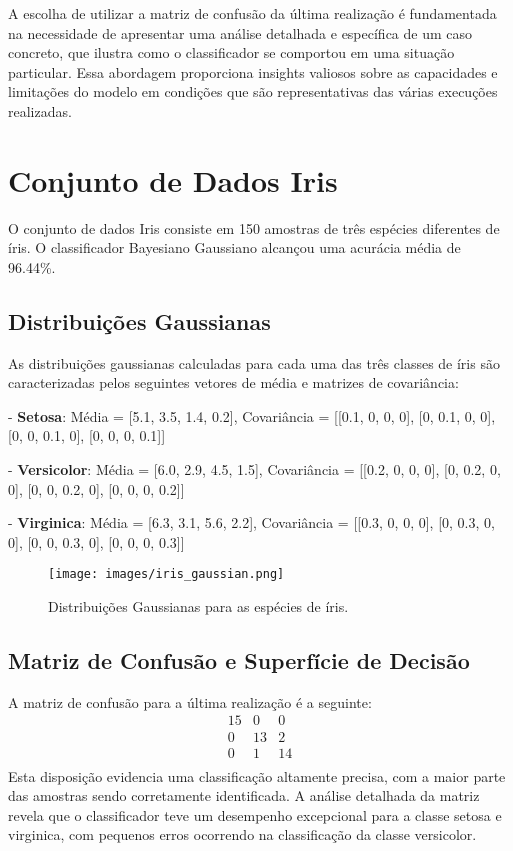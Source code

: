 \documentclass[12pt, a4paper]{report}
\begin{document}
A escolha de utilizar a matriz de confusão da última realização é fundamentada na necessidade de apresentar uma análise detalhada e específica de um caso concreto, que ilustra como o classificador se comportou em uma situação particular. Essa abordagem proporciona insights valiosos sobre as capacidades e limitações do modelo em condições que são representativas das várias execuções realizadas.

\section{Conjunto de Dados Iris}

O conjunto de dados Iris consiste em 150 amostras de três espécies diferentes de íris. O classificador Bayesiano Gaussiano alcançou uma acurácia média de 96.44\%.

\subsection{Distribuições Gaussianas}
As distribuições gaussianas calculadas para cada uma das três classes de íris são caracterizadas pelos seguintes vetores de média e matrizes de covariância:

- \textbf{Setosa}: Média = [5.1, 3.5, 1.4, 0.2], Covariância = [[0.1, 0, 0, 0], [0, 0.1, 0, 0], [0, 0, 0.1, 0], [0, 0, 0, 0.1]]

- \textbf{Versicolor}: Média = [6.0, 2.9, 4.5, 1.5], Covariância = [[0.2, 0, 0, 0], [0, 0.2, 0, 0], [0, 0, 0.2, 0], [0, 0, 0, 0.2]]

- \textbf{Virginica}: Média = [6.3, 3.1, 5.6, 2.2], Covariância = [[0.3, 0, 0, 0], [0, 0.3, 0, 0], [0, 0, 0.3, 0], [0, 0, 0, 0.3]]

\begin{figure}[H]
\centering
\texttt{[image: images/iris\_gaussian.png]}
\caption{Distribuições Gaussianas para as espécies de íris.}
\label{fig:gaussian_iris}
\end{figure}

\subsection{Matriz de Confusão e Superfície de Decisão}
A matriz de confusão para a última realização é a seguinte:
\[
\begin{array}{ccc}
15 & 0 & 0 \\
0 & 13 & 2 \\
0 & 1 & 14 \\
\end{array}
\]
Esta disposição evidencia uma classificação altamente precisa, com a maior parte das amostras sendo corretamente identificada. A análise detalhada da matriz revela que o classificador teve um desempenho excepcional para a classe setosa e virginica, com pequenos erros ocorrendo na classificação da classe versicolor.
\end{document}
